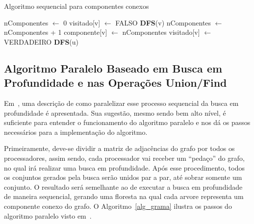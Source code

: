 \documentclass[12pt]{article}
\begin{document}
\begin{algorithm}[htp!]
    \DontPrintSemicolon
    \caption{Algoritmo sequencial para componentes conexos}
    \label{alg_seq}
	{
        nComponentes $\gets$ 0\;
        {
            visitado[v] $\gets$ FALSO\;
        }
        {
            {
                \textbf{DFS}(v)\;
                nComponentes $\gets$ nComponentes + 1\;
            }
        }
    }
    {
        componente[v] $\gets$ nComponentes\; 
        visitado[v] $\gets$ VERDADEIRO\;
        {
            {
                \textbf{DFS}(u)\;
            }
        }
    }
\end{algorithm}

\subsection{Algoritmo Paralelo Baseado em Busca em Profundidade e nas Operações Union/Find}

Em~\cite{Grama:2003}, uma descrição de como paralelizar esse processo sequencial da busca em profundidade é apresentada. Sua sugestão, mesmo sendo bem alto nível, é suficiente para entender o funcionamento do algoritmo paralelo e nos dá os passos necessários para a implementação do algoritmo. 

Primeiramente, deve-se dividir a matriz de adjacências do grafo por todos os processadores, assim sendo, cada processador vai receber um “pedaço” do grafo, no qual irá realizar uma busca em profundidade. Após esse procedimento, todos os conjuntos gerados pela busca serão unidos par a par, até sobrar somente um conjunto. O resultado será semelhante ao de executar a busca em profundidade de maneira sequencial, gerando uma floresta na qual cada arvore representa um componente conexo do grafo. O Algoritmo~\ref{alg_grama} ilustra os passos do algoritmo paralelo visto em~\cite{Grama:2003}.
\end{document}
